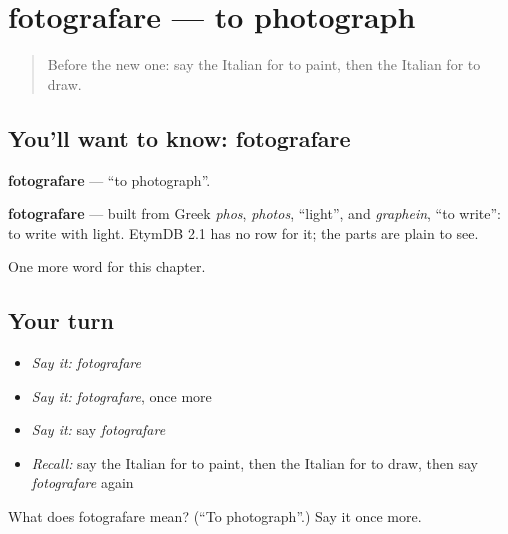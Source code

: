 \section[fotografare]{fotografare — to photograph}

\label{lesson:IT-C141-fotografare}



\begin{quote}
Before the new one: say the Italian for to paint, then the Italian for to draw.
\end{quote}

\subsection*{You'll want to know: fotografare}
\textbf{fotografare} — \textquotedblleft{}to photograph\textquotedblright{}.

\begin{cousinweb}
\textbf{fotografare} — built from Greek \emph{phos}, \emph{photos}, \textquotedblleft{}light\textquotedblright{}, and \emph{graphein}, \textquotedblleft{}to write\textquotedblright{}: to write with light. EtymDB 2.1 has no row for it; the parts are plain to see.
\end{cousinweb}

\begin{grammarlens}[title={What you've built}]
One more word for this chapter.
\end{grammarlens}

\subsection*{Your turn}
\begin{itemize}
\raggedright
  \item \emph{Say it:} \emph{fotografare}
  \item \emph{Say it:} \emph{fotografare}, once more
  \item \emph{Say it:} say \emph{fotografare}
  \item \emph{Recall:} say the Italian for to paint, then the Italian for to draw, then say \emph{fotografare} again
\end{itemize}

\begin{tcolorbox}[breakable,colback=teal!4,colframe=teal!35!black,title={Before you move on}]
What does fotografare mean? (\textquotedblleft{}To photograph\textquotedblright{}.) Say it once more.
\end{tcolorbox}
